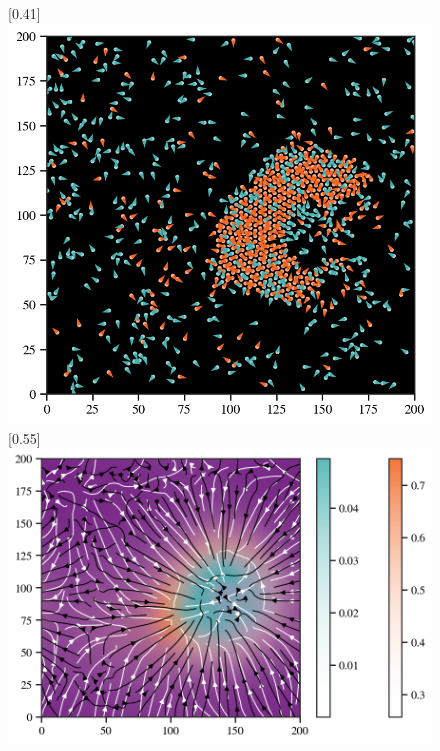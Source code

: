 \documentclass{article}
\begin{document}
\begin{figure}[htbp]
    \centering
    [0.41\linewidth]{
      \includegraphics[width=\linewidth]{figs/particle.png}
    }
    \hfill
    [0.55\linewidth]{
      \includegraphics[width=\linewidth]{figs/streamplot.png}
    }
\end{figure}



\end{document}
